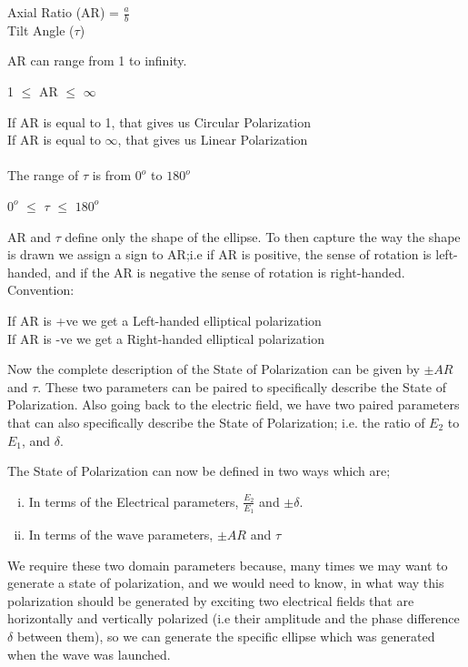 \begin{center}
Axial Ratio (AR) = $\frac{a}{b}$\\
Tilt Angle ($\tau$)
\end{center}
AR can range from 1 to infinity.\begin{center}
1 $\leq $ AR $\leq $ $\infty $
\end{center}
If AR is equal to 1, that gives us Circular Polarization\\
If AR is equal to $\infty$, that gives us Linear Polarization\\
\\
The range of $\tau $ is from $0^{o}$ to $180^{o}$ 
\begin{center}
$0^{o}$ $\leq $ $\tau $ $\leq $ $180^{o} $
\end{center}
AR and $\tau $ define only the shape of the ellipse. To then capture the way the shape is drawn we assign a sign to AR;i.e if AR is positive, the sense of rotation is left-handed, and if the AR is negative the sense of rotation is right-handed.\\
Convention:
\begin{center}
If AR is +ve we get a Left-handed elliptical polarization\\
If AR is -ve we get a Right-handed elliptical polarization
\end{center}
Now the complete description of the State of Polarization can be given by $\pm AR$ and $\tau $. These two parameters can be paired to specifically describe the State of Polarization. Also going back to the electric field, we have two paired parameters that can also specifically describe the State of Polarization; i.e. the ratio of $ E_2 $ to $ E_1 $, and $\delta$.

The State of Polarization can now be defined in two ways which are;
\begin{enumerate}[(i)]
\item In terms of the Electrical parameters, $\frac{E_2}{E_1}$ and $\pm \delta $.
\item In terms of the wave parameters, $\pm AR $ and $\tau $
\end{enumerate}
We require these two domain parameters because, many times we may want to generate a state of polarization, and we would need to know, in what way this polarization should be generated by exciting two electrical fields that are horizontally and vertically polarized (i.e their amplitude and the phase difference $\delta $ between them), so we can generate the specific ellipse which was generated when the wave was launched.

